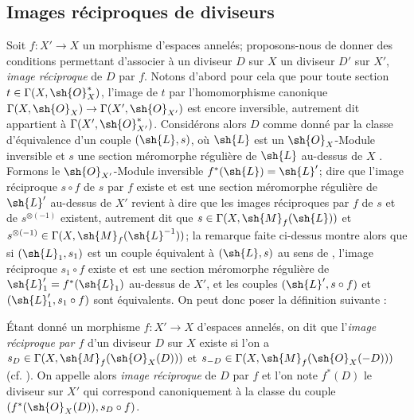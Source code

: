\subsection{Images réciproques de diviseurs}
\label{IV.21.4}

\begin{env}[21.4.1]
Soit $f:X'\to X$ un morphisme d'espaces annelés;
proposons-nous de donner des conditions permettant d'associer à un diviseur $D$ sur $X$ un diviseur $D'$ sur $X'$, \emph{image réciproque} de $D$ par $f$.
Notons d'abord pour cela que pour toute section $t\in\Gamma(X,\sh{O}_X^*)$, l'image de $t$ par l'homomorphisme canonique $\Gamma(X,\sh{O}_X)\to\Gamma(X',\sh{O}_{X'})$ est encore inversible, autrement dit appartient à $\Gamma(X',\sh{O}_{X'}^*)$.
Considérons alors $D$ comme donné par la classe d'équivalence d'un couple $(\sh{L},s)$, où $\sh{L}$ est un $\sh{O}_X$-Module inversible et $s$ une section méromorphe régulière de $\sh{L}$ au-dessus de $X$ .
Formons le $\sh{O}_{X'}$-Module inversible $f^*(\sh{L})=\sh{L}'$;
dire que l'image réciproque $s\circ f$ de $s$ par $f$ existe  et est une section méromorphe régulière de $\sh{L}'$ au-dessus de $X'$ revient à dire que les images réciproques par $f$ de $s$ et de $s^{\otimes(-1)}$ existent, autrement dit que $s\in\Gamma(X,\sh{M}_f(\sh{L}))$ et $s^{\otimes(-1)}\in\Gamma(X,\sh{M}_f(\sh{L}^{-1}))$;
la remarque faite ci-dessus montre alors que si $(\sh{L}_1,s_1)$ est un couple équivalent à $(\sh{L},s)$ au sens de , l'image réciproque $s_1\circ f$ existe et est une section méromorphe régulière de $\sh{L}_1'=f^*(\sh{L}_1)$ au-dessus de $X'$, et les couples $(\sh{L}',s\circ f)$ et $(\sh{L}_1',s_1\circ f)$ sont équivalents.
On peut donc poser la définition suivante :
\end{env}

\begin{definition}[21.4.2]
Étant donné un morphisme $f:X'\to X$ d'espaces annelés, on dit que l'\emph{image réciproque par $f$} d'un diviseur $D$ sur $X$ existe si l'on a $s_D\in\Gamma(X,\sh{M}_f(\sh{O}_X(D)))$ et $s_{-D}\in\Gamma(X,\sh{M}_f(\sh{O}_X(-D)))$ (cf. ).
On appelle alors \emph{image réciproque} de $D$ par $f$ et l'on note $f^*(D)$ le diviseur sur $X'$ qui correspond canoniquement  à la classe du couple $(f^*(\sh{O}_X(D)),s_D\circ f)$.
\end{definition}

